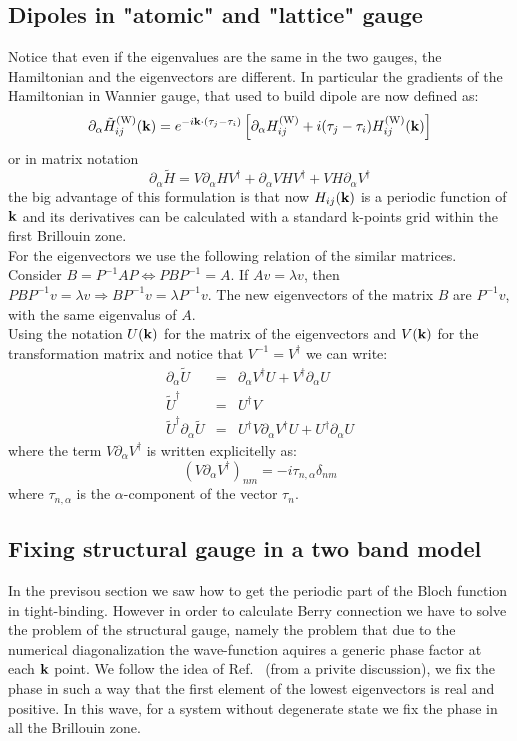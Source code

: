 \documentclass[preprint,showpacs,prb,superscriptaddress,aps,floatfix]{revtex4-1}
\newcommand{\kk}{{\bf k}}
\newcommand{\be}{\begin{equation}}
\newcommand{\ee}{\end{equation}}
\newcommand{\bea}{\begin{eqnarray}}
\newcommand{\eea}{\end{eqnarray}}
\renewcommand{\[}{\left[}
\renewcommand{\]}{\right]}
\renewcommand{\(}{\left(}
\renewcommand{\)}{\right)}
\def\pw{^{({\rm W})}}
\begin{document}
\subsection{Dipoles in "atomic" and "lattice" gauge}
Notice that even if the eigenvalues are the same in the two gauges, the Hamiltonian and the eigenvectors are different. In particular the gradients of the Hamiltonian in Wannier gauge, that used to build dipole are now defined as:
\be
\partial_\alpha \tilde H_{ij}\pw(\kk)=e^{-i \kk \cdot (\tau_j -\tau_i)} \left [ \partial_\alpha H_{ij}\pw + i(\tau_j -\tau_i) H_{ij}\pw(\kk) \right ]
\ee
or in matrix notation
\be
\partial_\alpha \tilde H=V \partial_\alpha H V^\dagger + \partial_\alpha V H V^\dagger +  V H \partial_\alpha V^\dagger 
\ee
the big advantage of this formulation is that now $H_{ij}(\kk)$ is a periodic function of  $\kk$ and its derivatives can be calculated with a standard k-points grid within the first Brillouin zone.\\
For the eigenvectors we use the following relation of the similar matrices. Consider $B=P^{-1}AP \Longleftrightarrow  P B P^{-1} =A$. If $Av=\lambda v$, then $PBP^{-1} v = \lambda v \Longrightarrow BP^{-1} v = \lambda P^{-1} v $. The new eigenvectors of the matrix $B$ are $P^{-1} v$, with the same eigenvalus of $A$.\\
Using the notation $U(\kk)$ for the matrix of the eigenvectors and $V(\kk)$ for the transformation matrix and notice that $V^{-1} = V^{\dagger}$ we can write:
\bea
\partial_\alpha \tilde U &=& \partial_\alpha V^{\dagger} U + V^{\dagger} \partial_\alpha U \\
\tilde U^{\dagger} &=& U^{\dagger} V \\
\tilde U^{\dagger} \partial_\alpha \tilde U &=& U^{\dagger} V \partial_\alpha V^{\dagger} U + U^{\dagger} \partial_\alpha U
\eea
where the term $V \partial_\alpha V^{\dagger}$ is written explicitelly as:
\be
(V \partial_\alpha V^{\dagger})_{nm}=-i\tau_{n,\alpha}\delta_{nm}
\ee
where $\tau_{n,\alpha}$ is the $\alpha$-component of the vector $\tau_n$.

\subsection{Fixing structural gauge in a two band model}
In the previsou section we saw how to get the periodic part of the Bloch function in tight-binding. However in order to calculate Berry connection we have to solve the problem of the structural gauge,\cite{yue2022introduction} namely the problem that due to the numerical diagonalization the wave-function aquires a generic phase factor at each $\kk$ point. We follow the idea of Ref.~ (from a privite discussion), we fix the phase in such a way that the first element of the lowest eigenvectors is real and positive. In this wave, for a system without degenerate state we fix the phase in all the  Brillouin zone.
\end{document}
